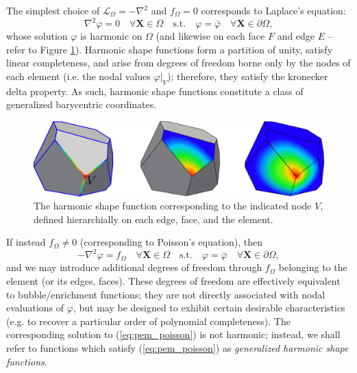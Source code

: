 	The simplest choice of $\mathcal{L}_{\Omega} = -\nabla^2$ and $f_{\Omega} = 0$ corresponds to Laplace's equation:
	\begin{equation}
		\nabla^2 \varphi = 0 \quad \forall \mathbf{X} \in \Omega \quad \text{s.t.} \quad \varphi = \bar{\varphi} \quad \forall \mathbf{X} \in \partial \Omega,
		\label{eq:pem_laplace}
	\end{equation}
	whose solution $\varphi$ is harmonic on $\Omega$ (and likewise on each face $F$ and edge $E$ -- refer to Figure \ref{fig:harmonic_sfs}). Harmonic shape functions form a partition of unity, satisfy linear completeness, and arise from degrees of freedom borne only by the nodes of each element (i.e. the nodal values $\varphi|_V$); therefore, they satisfy the kronecker delta property. As such, harmonic shape functions constitute a class of generalized barycentric coordinates.
	
\begin{figure} [!ht]
	\centering
	\includegraphics[width = 6.0in]{figures/harmonic_sfs.pdf}
	\caption{The harmonic shape function corresponding to the indicated node $V$, defined hierarchially on each edge, face, and the element.}
	\label{fig:harmonic_sfs}
\end{figure}
	
	If instead $f_{\Omega} \neq 0$ (corresponding to Poisson's equation), then
	\begin{equation}
		-\nabla^2 \varphi = f_{\Omega} \quad \forall \mathbf{X} \in \Omega \quad \text{s.t.} \quad \varphi = \bar{\varphi} \quad \forall \mathbf{X} \in \partial \Omega,
		\label{eq:pem_poisson}
	\end{equation}
	and we may introduce additional degrees of freedom through $f_{\Omega}$ belonging to the element (or its edges, faces). These degrees of freedom are effectively equivalent to bubble/enrichment functions; they are not directly associated with nodal evaluations of $\varphi$, but may be designed to exhibit certain desirable characteristics (e.g. to recover a particular order of polynomial completeness). The corresponding solution to (\ref{eq:pem_poisson}) is not harmonic; instead, we shall refer to functions which satisfy (\ref{eq:pem_poisson}) as \textit{generalized harmonic shape functions}.
	
